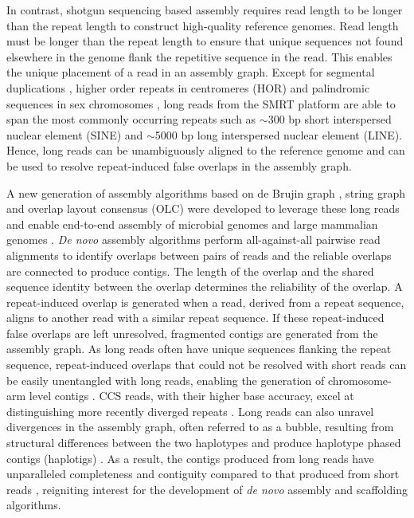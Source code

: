 In contrast, shotgun sequencing based  assembly requires read length to be longer than the repeat length to construct high-quality reference genomes. Read length must be longer than the repeat length to ensure that unique sequences not found elsewhere in the genome flank the repetitive sequence in the read. This enables the unique placement of a read in an assembly graph. Except for segmental duplications \cite{Bailey2002-xn}, higher order repeats in centromeres (HOR) \cite{Willard1985-bo}  and palindromic sequences in sex chromosomes \cite{Skaletsky2003-sr}, long reads from the SMRT platform are able to span the most commonly occurring repeats such as $\sim$300 bp short interspersed nuclear element (SINE) and $\sim$5000 bp long interspersed nuclear element (LINE). Hence, long reads can be unambiguously aligned to the reference genome and can be used to resolve repeat-induced false overlaps in the assembly graph. 

A new generation of assembly algorithms based on de Brujin graph \cite{Lin2016-vl}, string graph \cite{Myers2005-ei, Chin2016-at} and overlap layout consensus (OLC) \cite{Koren2017-cq} were developed to leverage these long reads and enable end-to-end assembly of microbial genomes\cite{Bashir2012-cs, Chin2013-hp} and large mammalian genomes \cite{Chin2016-at, Koren2017-cq}. \textit{De novo} assembly algorithms perform all-against-all pairwise read alignments to identify overlaps between pairs of reads and the reliable overlaps are connected to produce contigs. The length of the overlap and the shared sequence identity between the overlap determines the reliability of the overlap. A repeat-induced overlap is generated when a read, derived from a repeat sequence, aligns to another read with a similar repeat sequence. If these repeat-induced false overlaps are left unresolved, fragmented contigs are generated from the assembly graph. As long reads often have unique sequences flanking the repeat sequence, repeat-induced overlaps that could not be resolved with short reads can be easily unentangled with long reads, enabling the generation of chromosome-arm level contigs \cite{Nurk2020-gu, Cheng2021-ij}. CCS reads, with their higher base accuracy, excel at distinguishing more recently diverged repeats \cite{Nurk2022-dv}. Long reads can also unravel divergences in the assembly graph, often referred to as a bubble, resulting from structural differences between the two haplotypes and produce haplotype phased contigs (haplotigs) \cite{Chin2016-at}. As a result, the contigs produced from long reads have unparalleled completeness and contiguity compared to that produced from short reads \cite{Gordon2016-ho}, reigniting interest for the development of \textit{de novo} assembly and scaffolding algorithms.  


